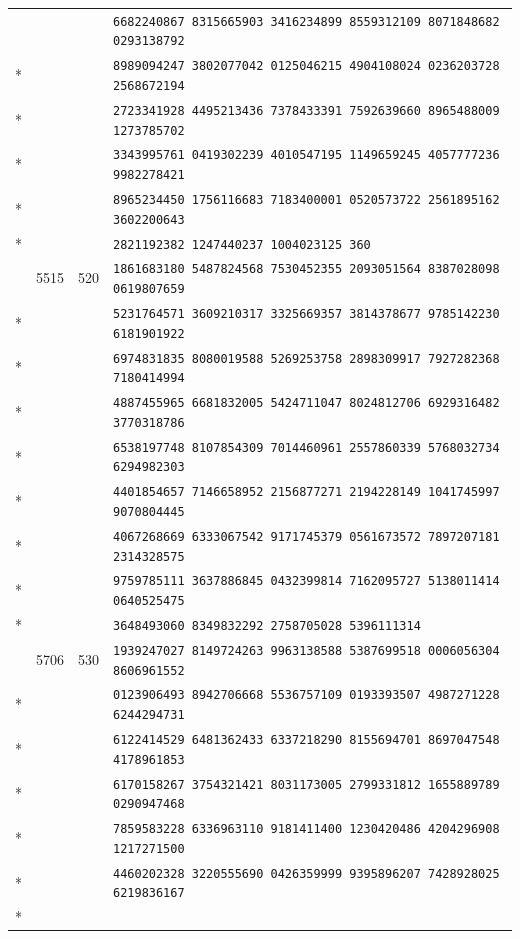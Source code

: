 \documentclass[10pt]{article}
\begin{document}
\begin{longtable}{@{}r@{\quad}r@{\quad}r@{\quad}l@{}}
 & &  & \texttt{6682240867 8315665903 3416234899 8559312109 8071848682 0293138792}\\*
 & &  & \texttt{8989094247 3802077042 0125046215 4904108024 0236203728 2568672194}\\*
 & &  & \texttt{2723341928 4495213436 7378433391 7592639660 8965488009 1273785702}\\*
 & &  & \texttt{3343995761 0419302239 4010547195 1149659245 4057777236 9982278421}\\*
 & &  & \texttt{8965234450 1756116683 7183400001 0520573722 2561895162 3602200643}\\*
 & &  & \texttt{2821192382 1247440237 1004023125 360}\\
\addlinespace[2pt]
96 & 5515 & 520 & \texttt{1861683180 5487824568 7530452355 2093051564 8387028098 0619807659}\\*
 & &  & \texttt{5231764571 3609210317 3325669357 3814378677 9785142230 6181901922}\\*
 & &  & \texttt{6974831835 8080019588 5269253758 2898309917 7927282368 7180414994}\\*
 & &  & \texttt{4887455965 6681832005 5424711047 8024812706 6929316482 3770318786}\\*
 & &  & \texttt{6538197748 8107854309 7014460961 2557860339 5768032734 6294982303}\\*
 & &  & \texttt{4401854657 7146658952 2156877271 2194228149 1041745997 9070804445}\\*
 & &  & \texttt{4067268669 6333067542 9171745379 0561673572 7897207181 2314328575}\\*
 & &  & \texttt{9759785111 3637886845 0432399814 7162095727 5138011414 0640525475}\\*
 & &  & \texttt{3648493060 8349832292 2758705028 5396111314}\\
\addlinespace[2pt]
97 & 5706 & 530 & \texttt{1939247027 8149724263 9963138588 5387699518 0006056304 8606961552}\\*
 & &  & \texttt{0123906493 8942706668 5536757109 0193393507 4987271228 6244294731}\\*
 & &  & \texttt{6122414529 6481362433 6337218290 8155694701 8697047548 4178961853}\\*
 & &  & \texttt{6170158267 3754321421 8031173005 2799331812 1655889789 0290947468}\\*
 & &  & \texttt{7859583228 6336963110 9181411400 1230420486 4204296908 1217271500}\\*
 & &  & \texttt{4460202328 3220555690 0426359999 9395896207 7428928025 6219836167}\\*

\end{longtable}
\end{document}
